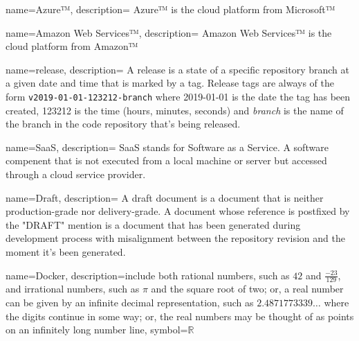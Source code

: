 {
    name={Azure™️},
    description={
        Azure™️ is the cloud platform from Microsoft™️
    }
}

{
    name={Amazon Web Services™️},
    description={
        Amazon Web Services™️ is the cloud platform from Amazon™️
    }
}

{
    name={release},
    description={
        A release is a state of a specific repository branch at a given date and time that is marked by a tag.
        Release tags are always of the form \texttt{v2019-01-01-123212-branch} where 2019-01-01 is the date
        the tag has been created, 123212 is the time (hours, minutes, seconds) and \emph{branch} is the name
        of the branch in the code repository that's being released.
    }
}

{
    name={SaaS},
    description={
        SaaS stands for Software as a Service.
        A software compenent that is not executed from a local machine or server
        but accessed through a cloud service provider.
    }
}

{
    name={Draft},
    description={
        A draft document is a document that is neither production-grade nor
        delivery-grade. A document whose reference is postfixed by the "\-DRAFT"
        mention is a document that has been generated during development process
        with misalignment between the repository revision and the moment it's been
        generated.
    }
}


{
  name={Docker},
  description={include both rational numbers, such as $42$ and
               $\frac{-23}{129}$, and irrational numbers,
               such as $\pi$ and the square root of two; or,
               a real number can be given by an infinite decimal
               representation, such as $2.4871773339\ldots$ where
               the digits continue in some way; or, the real
               numbers may be thought of as points on an infinitely
               long number line},
  symbol={\ensuremath{\mathbb{R}}}
}
